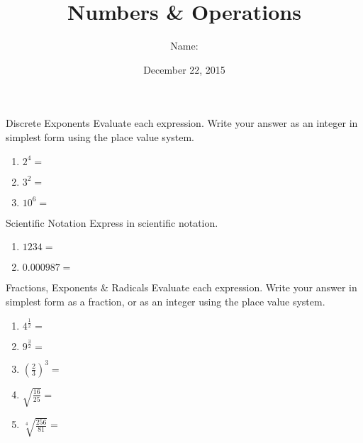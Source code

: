 \documentclass[12pt,letterpaper]{article}
\title{Numbers \& Operations}
\author{Name: \underline{\hspace{5cm}}}
\date{December 22, 2015}
\begin{document}
\maketitle

\thispagestyle{empty}

\begin{problem}{Discrete Exponents}
 Evaluate each expression. Write your answer as an integer in simplest form
 using the place value system.

 \begin{enumerate}[\hspace{.5cm}a.]
  \item $2^4=$ \hfill\underline{\hspace{3em}}
  \item $3^2=$ \hfill\underline{\hspace{3em}}
  \item $10^6=$ \hfill\underline{\hspace{6em}}
 \end{enumerate}
\end{problem}

\begin{problem}{Scientific Notation}
 Express in scientific notation.

 \begin{enumerate}[\hspace{.5cm}a.]
  \item $1234=$ \hfill\underline{\hspace{6em}}
  \item $0.000987=$ \hfill\underline{\hspace{6em}}
 \end{enumerate}
\end{problem}

\begin{problem}{Fractions, Exponents \& Radicals}
 Evaluate each expression. Write your answer in simplest form as a fraction, or
 as an integer using the place value system.

 \begin{enumerate}[\hspace{.5cm}a.]
  \item $4^{\frac{1}{2}}=$ \hfill\underline{\hspace{3em}}
  \item $9^{\frac{3}{2}}=$ \hfill\underline{\hspace{3em}}
  \item ${\left(\frac{2}{3}\right)}^3=$ \hfill\underline{\hspace{3em}}
  \item $\sqrt{\frac{16}{25}}=$ \hfill\underline{\hspace{3em}}
  \item $\sqrt[4]{\frac{256}{81}}=$ \hfill\underline{\hspace{3em}}
 \end{enumerate}
\end{problem}
\end{document}
